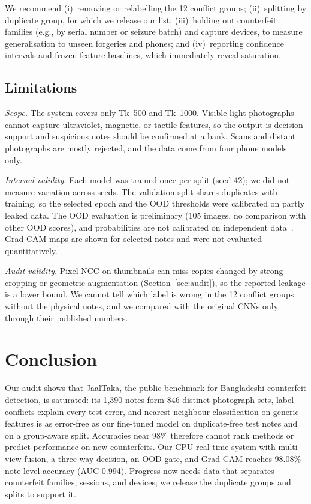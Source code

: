 \documentclass[pdflatex,sn-mathphys-num]{sn-jnl}
\begin{document}
We recommend (i)~removing or relabelling the 12 conflict groups; (ii)~splitting by
duplicate group, for which we release our list; (iii)~holding out counterfeit families
(e.g., by serial number or seizure batch) and capture devices, to measure generalisation
to unseen forgeries and phones; and (iv)~reporting confidence intervals and
frozen-feature baselines, which immediately reveal saturation.

\subsection{Limitations}\label{sec:limits}

\emph{Scope.} The system covers only Tk~500 and Tk~1000. Visible-light photographs
cannot capture ultraviolet, magnetic, or tactile features, so the output is decision
support and suspicious notes should be confirmed at a bank. Scans and distant
photographs are mostly rejected, and the data come from four phone models only.

\emph{Internal validity.} Each model was trained once per split (seed 42); we did not
measure variation across seeds. The validation split shares duplicates with training,
so the selected epoch and the OOD thresholds were calibrated on partly leaked data. The
OOD evaluation is preliminary (105 images, no comparison with other OOD scores), and
probabilities are not calibrated on independent data~\cite{guo2017calibration}.
Grad-CAM maps are shown for selected notes and were not evaluated quantitatively.

\emph{Audit validity.} Pixel NCC on thumbnails can miss copies changed by strong
cropping or geometric augmentation (Section~\ref{sec:audit}), so the reported leakage is
a lower bound. We cannot tell which label is wrong in the 12 conflict groups without the
physical notes, and we compared with the original CNNs only through their published
numbers.

\section{Conclusion}\label{sec:conclusion}

Our audit shows that JaalTaka, the public benchmark for Bangladeshi counterfeit
detection, is saturated: its 1{,}390 notes form 846 distinct photograph sets, label
conflicts explain every test error, and nearest-neighbour classification on generic
features is as error-free as our fine-tuned model on duplicate-free test notes and on a
group-aware split.
Accuracies near 98\% therefore cannot rank methods or predict performance on new
counterfeits. Our CPU-real-time system with multi-view fusion, a three-way decision, an
OOD gate, and Grad-CAM reaches 98.08\% note-level accuracy (AUC 0.994). Progress now
needs data that separates counterfeit families, sessions, and devices; we release the
duplicate groups and splits to support it.
\end{document}
